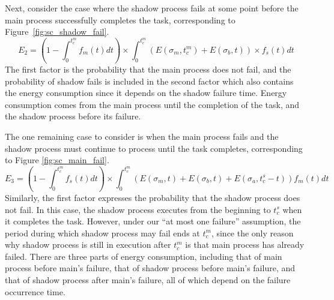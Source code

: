 Next, consider the case where the shadow process fails at some point
before the main process successfully completes the task, corresponding to Figure~\ref{fig:sc_shadow_fail}.
\begin{equation}
E_2 = (1-\int_0^{t_c^m}f_m(t)dt) \times 
      \int_0^{t_c^m}(E(\sigma_m,t_c^m)+E(\sigma_b,t)) \times f_s(t)dt
\label{eq:energy_shadow_fail}
\end{equation}
The first factor is the probability that the main process does not
fail, and the probability of shadow fails is included in the second factor which also contains the energy consumption since it depends on the shadow failure time. Energy consumption comes from the main process until the completion of the task,
and the shadow process before its failure.

The one remaining case to consider is when the main process fails and
the shadow process must continue to process until the task completes,
corresponding to Figure \ref{fig:sc_main_fail}.
\begin{equation}
E_3 = (1-\int_0^{t_c^m}f_s(t)dt) \times \int_0^{t_c^m}(E(\sigma_m,t)+ E(\sigma_b,t)+E(\sigma_a,t_c^s-t))f_m(t)dt
\label{eq:energy_main_fail}
\end{equation}
Similarly, the first factor expresses the probability that the shadow process does
not fail. In this case, the shadow process executes from the beginning to
$t_c^s$ when it completes the task. However, under our ``at most one
failure'' assumption, the period during which shadow process may fail
ends at $t_c^m$, since the only reason why shadow process is still in
execution after $t_c^m$ is that main process has already failed. There
are three parts of energy consumption, including that of main process
before main's failure, that of shadow process before main's failure,
and that of shadow process after main's failure, all of which depend
on the failure occurrence time. 

